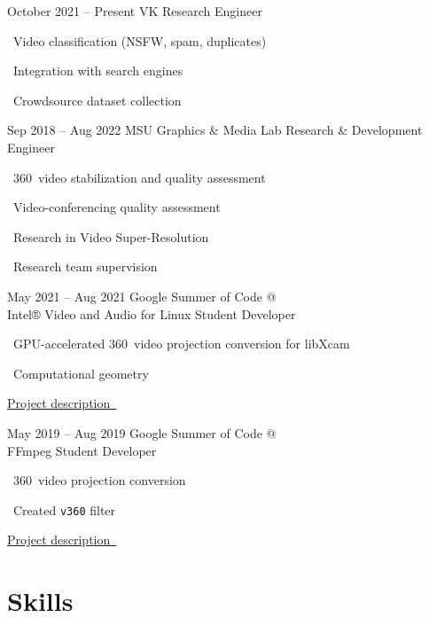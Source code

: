 \documentclass{tccv}
\newcommand{\itempoint}{\faAngleDoubleRight~}
\newcommand{\sphere}{360\textdegree~}
\begin{document}
\begin{eventlist}

\item{October 2021 -- Present}
     {VK}
     {Research Engineer}

     \itempoint Video classification (NSFW, spam, duplicates)

     \itempoint Integration with search engines

     \itempoint Crowdsource dataset collection

\item{Sep 2018 -- Aug 2022}
     {MSU Graphics \& Media Lab}
     {Research \& Development Engineer}
     
     \vspace{-10pt}
     \itempoint \sphere video stabilization and quality assessment

     \itempoint Video-conferencing quality assessment

     \itempoint Research in Video Super-Resolution

     \itempoint Research team supervision


\item{May 2021 -- Aug 2021}
     {Google Summer of Code @ \\ Intel® Video and Audio for Linux}
     {Student Developer}

     \itempoint GPU-accelerated \sphere video projection conversion for libXcam

     \itempoint Computational geometry

     \href{https://unishift.github.io/project/2021-08-20-gsoc-libxcam}{Project description~\faExternalLink*}

\item{May 2019 -- Aug 2019}
     {Google Summer of Code @ \\ FFmpeg}
     {Student Developer}
     
     \itempoint \sphere video projection conversion

     \itempoint Created \texttt{v360} filter

     \href{https://unishift.github.io/project/2019-08-26-gsoc-ffmpeg}{Project description~\faExternalLink*}

\end{eventlist}

\section{Skills}
\end{document}

